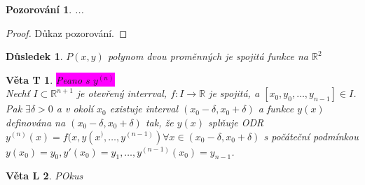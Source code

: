 \documentclass{article}
\DeclareRobustCommand{\hlvetamath}[1]{{\colorbox{magenta}{#1}}}
\newtheorem{vetat}{Věta T}[section]
\newtheorem{vetal}[vetat]{Věta L}
\newtheorem*{dusledek}{Důsledek}
\newtheorem*{pozorovani}{Pozorování}
\theoremstyle{definition}
\begin{document}
\begin{pozorovani}
	...
\end{pozorovani}

\begin{proof}
	Důkaz pozorování.
\end{proof}

\begin{dusledek}
	\(P(x,y)\) polynom dvou proměnných je spojitá funkce na \(\mathbb{R}^{2}\)
\end{dusledek}

\begin{vetat}
	\hlvetamath{Peano s $y^{(n)}$}
	\\
	Nechť \(I \subset \mathbb{R}^{n+1}\) je otevřený interrval, \(f: I \to \mathbb{R}\) je spojitá, a \linebreak[1]
	\([x_0, y_0, \dots, y_{n-1}] \in I\). Pak \linebreak[1] \(\exists \delta > 0\) a v okolí \linebreak[1]
	\(x_0\) existuje interval \linebreak[1] \((x_0- \delta , x_0 + \delta)\) a funkce \(y(x)\) definována na 
	\linebreak[1] \((x_0 - \delta, x_0 + \delta)\) tak, že \(y(x)\) splňuje ODR \linebreak[1]
	\(y^{(n)}(x) = f(x, y(x^), \dots, y^{(n-1)}) \forall x \in (x_0 - \delta, x_0 + \delta)\) s počáteční podmínkou 
	\(y(x_0) = y_0, y'(x_0) = y_1, \dots , y^{(n-1)}(x_0) = y_{n-1}\).
\end{vetat}

\begin{vetal}
POkus
\end{vetal}
\end{document}
